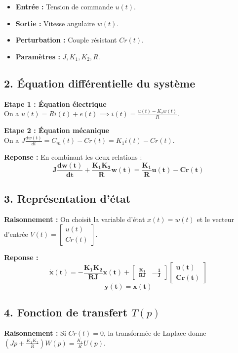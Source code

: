 \documentclass[11pt,a4paper]{article}
\begin{document}
\begin{itemize}
    \item \textbf{Entrée :} Tension de commande $u(t)$.
    \item \textbf{Sortie :} Vitesse angulaire $w(t)$.
    \item \textbf{Perturbation :} Couple résistant $Cr(t)$.
    \item \textbf{Paramètres :} $J, K_1, K_2, R$.
\end{itemize}

\subsection*{2. Équation différentielle du système}

\textbf{Etape 1 : Équation électrique}\\
On a $u(t) = R i(t) + e(t) \implies i(t) = \frac{u(t) - K_2 w(t)}{R}$.

\textbf{Etape 2 : Équation mécanique}\\
On a $J \frac{dw(t)}{dt} = C_m(t) - Cr(t) = K_1 i(t) - Cr(t)$.

\textbf{Reponse :} En combinant les deux relations :
$$
\mathbf{J \frac{dw(t)}{dt} + \frac{K_1 K_2}{R} w(t) = \frac{K_1}{R} u(t) - Cr(t)}
$$

\subsection*{3. Représentation d'état}

\textbf{Raisonnement :} On choisit la variable d'état $x(t) = w(t)$ et le vecteur d'entrée $V(t) = \begin{bmatrix} u(t) \\ Cr(t) \end{bmatrix}$.

\textbf{Reponse :}
$$
\mathbf{\dot{x}(t) = -\frac{K_1 K_2}{R J} x(t) + \begin{bmatrix} \frac{K_1}{R J} & -\frac{1}{J} \end{bmatrix} \begin{bmatrix} u(t) \\ Cr(t) \end{bmatrix}}
$$
$$
\mathbf{y(t) = x(t)}
$$

\subsection*{4. Fonction de transfert $T(p)$}

\textbf{Raisonnement :} Si $Cr(t) = 0$, la transformée de Laplace donne $(J p + \frac{K_1 K_2}{R}) W(p) = \frac{K_1}{R} U(p)$.
\end{document}
